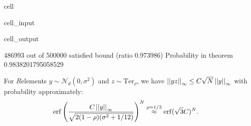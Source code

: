 \documentclass[letterpaper,10pt,english]{jupyterBook}
\begin{document}
\begin{sphinxuseclass}{cell}
\begin{sphinxVerbatimInput}
\begin{sphinxuseclass}{cell_input}
\begin{sphinxVerbatim}[commandchars=\\\{\}]
          
\end{sphinxVerbatim}

\end{sphinxuseclass}\end{sphinxVerbatimInput}
\begin{sphinxVerbatimOutput}

\begin{sphinxuseclass}{cell_output}
\begin{sphinxVerbatim}[commandchars=\\\{\}]
486993 out of 500000 satisfied bound (ratio 0.973986)
Probability in theorem 0.9838201795058529
\end{sphinxVerbatim}

\end{sphinxuseclass}\end{sphinxVerbatimOutput}

\end{sphinxuseclass}\label{\detokenize{Thesis:conclusion-on-delta-r}}
\sphinxAtStartPar
For \(R\)\sphinxhyphen{}elements \(y \sim \mathcal N_d(0,\sigma^2)\) and \(z \sim \mathrm{Ter}_{\rho}\), we have \(\left\lvert\left\lvert yz \right\rvert\right\rvert_\infty \le C\sqrt{N}\left\lvert\left\lvert y \right\rvert\right\rvert_\infty\) with probability approximately:
\begin{equation*}
\begin{split}\mathrm{erf} \left( \frac{C\left\lvert\left\lvert y \right\rvert\right\rvert_\infty}{\sqrt{2(1-\rho)(\sigma^2+1/12)}}\right)^N \overset{\rho = 1/3}{\approx} \mathrm{erf}(\sqrt{3}C)^N.\end{split}
\end{equation*}
\begin{DUlineblock}{0em}
\item[] 
\end{DUlineblock}
\end{document}
